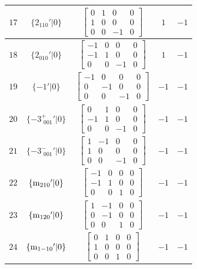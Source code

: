 \documentclass[fleqn,8pt]{jsarticle}
\begin{document}
\begin{longtable}{ccccc}
$ 17 $ & $ \{2{}_{110}{}'|0\} $ & $ \begin{bmatrix} 0 & 1 & 0 & 0 \\ 1 & 0 & 0 & 0 \\ 0 & 0 & -1 & 0 \end{bmatrix} $ & $ 1 $ & $ -1 $ \\ \hline
$ 18 $ & $ \{2{}_{010}{}'|0\} $ & $ \begin{bmatrix} -1 & 0 & 0 & 0 \\ -1 & 1 & 0 & 0 \\ 0 & 0 & -1 & 0 \end{bmatrix} $ & $ 1 $ & $ -1 $ \\ \hline
$ 19 $ & $ \{-1{}'|0\} $ & $ \begin{bmatrix} -1 & 0 & 0 & 0 \\ 0 & -1 & 0 & 0 \\ 0 & 0 & -1 & 0 \end{bmatrix} $ & $ -1 $ & $ -1 $ \\ \hline
$ 20 $ & $ \{-3^{+}_{\,\,001}{}'|0\} $ & $ \begin{bmatrix} 0 & 1 & 0 & 0 \\ -1 & 1 & 0 & 0 \\ 0 & 0 & -1 & 0 \end{bmatrix} $ & $ -1 $ & $ -1 $ \\ \hline
$ 21 $ & $ \{-3^{-}_{\,\,001}{}'|0\} $ & $ \begin{bmatrix} 1 & -1 & 0 & 0 \\ 1 & 0 & 0 & 0 \\ 0 & 0 & -1 & 0 \end{bmatrix} $ & $ -1 $ & $ -1 $ \\ \hline
$ 22 $ & $ \{{\rm m}_{210}{}'|0\} $ & $ \begin{bmatrix} -1 & 0 & 0 & 0 \\ -1 & 1 & 0 & 0 \\ 0 & 0 & 1 & 0 \end{bmatrix} $ & $ -1 $ & $ -1 $ \\ \hline
$ 23 $ & $ \{{\rm m}_{120}{}'|0\} $ & $ \begin{bmatrix} 1 & -1 & 0 & 0 \\ 0 & -1 & 0 & 0 \\ 0 & 0 & 1 & 0 \end{bmatrix} $ & $ -1 $ & $ -1 $ \\ \hline
$ 24 $ & $ \{{\rm m}_{1-10}{}'|0\} $ & $ \begin{bmatrix} 0 & 1 & 0 & 0 \\ 1 & 0 & 0 & 0 \\ 0 & 0 & 1 & 0 \end{bmatrix} $ & $ -1 $ & $ -1 $ \\
\end{longtable}
\end{document}

